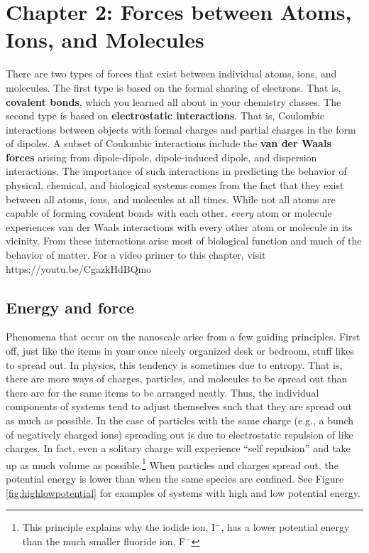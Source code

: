 \chapter{Chapter 2: Forces between Atoms, Ions, and Molecules}
\label{Forces between Atoms, Ions, and Molecules}

There are two types of forces that exist between individual atoms, ions, and molecules. The first type is based on the formal sharing of electrons. That is, \textbf{covalent bonds}, which you learned all about in your chemistry classes. The second type is based on \textbf{electrostatic interactions}. That is, Coulombic interactions between objects with formal charges and partial charges in the form of dipoles. A subset of Coulombic interactions include the \textbf{van der Waals forces} arising from dipole-dipole, dipole-induced dipole, and dispersion interactions. The importance of such interactions in predicting the behavior of physical, chemical, and biological systems comes from the fact that they exist between all atoms, ions, and molecules at all times. While not all atoms are capable of forming covalent bonds with each other, \textit{every} atom or molecule experiences van der Waals interactions with every other atom or molecule in its vicinity. From these interactions arise most of biological function and much of the behavior of matter. For a video primer to this chapter, visit https://youtu.be/CgazkHdBQmo

\section{Energy and force} Phenomena that occur on the nanoscale arise from a few guiding principles. First off, just like the items in your once nicely organized desk or bedroom, stuff likes to spread out. In physics, this tendency is sometimes due to entropy. That is, there are more ways of charges, particles, and molecules to be spread out than there are for the same items to be arranged neatly. Thus, the individual components of systems tend to adjust themselves such that they are spread out as much as possible. In the case of particles with the same charge (e.g., a bunch of negatively charged ions) spreading out is due to electrostatic repulsion of like charges. In fact, even a solitary charge will experience ``self repulsion'' and take up as much volume as possible.\footnote{This principle explains why the iodide ion, I$^-$, has a lower potential energy than the much smaller fluoride ion, F$^-$} When particles and charges spread out, the potential energy is lower than when the same species are confined. See Figure \ref{fig:highlowpotential} for examples of systems with high and low potential energy.

